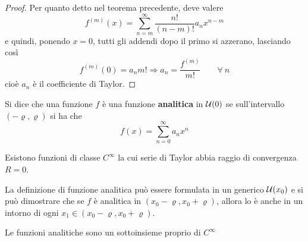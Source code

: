 \begin{proof}
Per quanto detto nel teorema precedente, deve valere
\begin{equation*}
    f^{(m)}(x)= \sum\limits_{n=m}^{\infty}{\frac{n!}{(n-m)!} a_n x^{n-m}}
\end{equation*}
e quindi, ponendo $x=0$, tutti gli addendi dopo il primo si azzerano, lasciando così
\begin{equation*}
    f^{(m)}(0)=a_n m! \Rightarrow a_n=\frac{f^{(m)}}{m!} \qquad \forall\ n
\end{equation*}
cioè $a_n$ è il coefficiente di Taylor.
\end{proof}
\begin{definition} \label{Def: Funzione analitica}
    Si dice che una funzione $f$ è una funzione \textbf{analitica} in $\mathcal{U}(0)$ se sull'intervallo $(-\varrho, \varrho)$ si ha che
    \begin{equation*}
        f(x)= \sum\limits_{n=0}^{\infty}{a_n x^n}
    \end{equation*}
\end{definition}
\begin{oss}
    Esistono funzioni di classe $C^\infty$ la cui serie di Taylor abbia raggio di convergenza $R=0$.
\end{oss}
\begin{oss}
    La definizione di funzione analitica può essere formulata in un generico $\mathcal{U}(x_0)$ e si può dimostrare che se $f$ è analitica in $(x_0-\varrho, x_0+\varrho)$, allora lo è anche in un intorno di ogni $x_1 \in (x_0-\varrho, x_0+\varrho)$.
\end{oss}
\begin{theorem}
    Le funzioni analitiche sono un sottoinsieme proprio di $C^\infty$
\end{theorem}
